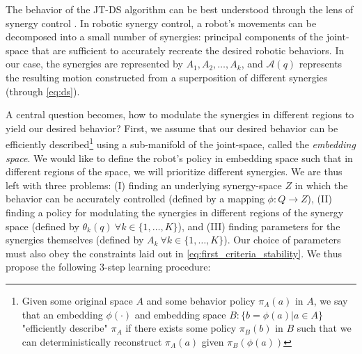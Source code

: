 \documentclass[letterpaper, 10 pt, conference,fleqn]{ieeeconf}
\begin{document}
The behavior of the JT-DS algorithm can be best understood through the lens of synergy control \cite{7954741}. In robotic synergy control, a robot's movements can be decomposed into a small number of synergies: principal components of the joint-space that are sufficient to accurately recreate the desired robotic behaviors. In our case, the synergies are represented by $A_1, A_2, \dots, A_k$, and $\mathcal{A}(q)$ represents the resulting motion constructed from a superposition of different synergies (through \eqref{eq:ds}). 

A central question becomes, how to modulate the synergies in different regions to yield our desired behavior? First, we assume that our desired behavior can be efficiently described\footnote{Given some original space $A$ and some behavior policy $\pi_A(a)$ in $A$, we say that an embedding $\phi(\cdot)$ and embedding space $B: \{b = \phi(a) | a \in A\}$ "efficiently describe" $\pi_A$ if there exists some policy $\pi_B(b)$ in $B$ such that we can deterministically reconstruct $\pi_A(a)$ given $\pi_B(\phi(a))$} using a sub-manifold of the joint-space, called the \emph{embedding space}. We would like to define the robot's policy in embedding space such that in different regions of the space, we will prioritize different synergies. We are thus left with three problems: (I) finding an underlying synergy-space $Z$ in which the behavior can be accurately controlled (defined by a mapping $\phi: Q \rightarrow Z$), (II) finding a policy for modulating the synergies in different regions of the synergy space (defined by $\theta_k(q)~\forall k\in\{1,\dots,K\}$), and (III) finding parameters for the synergies themselves (defined by $A_k~\forall k\in\{1,\dots,K\}$). Our choice of parameters must also obey the constraints laid out in \eqref{eq:first_criteria_stability}. We thus propose the following 3-step learning procedure:
\end{document}
